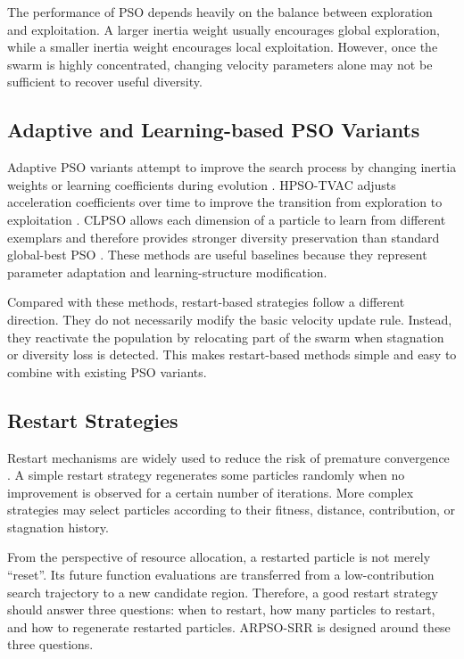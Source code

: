 \documentclass[conference]{IEEEtran}
\begin{document}
The performance of PSO depends heavily on the balance between exploration and exploitation. A larger inertia weight usually encourages global exploration, while a smaller inertia weight encourages local exploitation. However, once the swarm is highly concentrated, changing velocity parameters alone may not be sufficient to recover useful diversity.

\subsection{Adaptive and Learning-based PSO Variants}
Adaptive PSO variants attempt to improve the search process by changing inertia weights or learning coefficients during evolution \cite{b2,b12}. HPSO-TVAC adjusts acceleration coefficients over time to improve the transition from exploration to exploitation \cite{b11}. CLPSO allows each dimension of a particle to learn from different exemplars and therefore provides stronger diversity preservation than standard global-best PSO \cite{b4}. These methods are useful baselines because they represent parameter adaptation and learning-structure modification.

Compared with these methods, restart-based strategies follow a different direction. They do not necessarily modify the basic velocity update rule. Instead, they reactivate the population by relocating part of the swarm when stagnation or diversity loss is detected. This makes restart-based methods simple and easy to combine with existing PSO variants.

\subsection{Restart Strategies}
Restart mechanisms are widely used to reduce the risk of premature convergence \cite{b13,b14}. A simple restart strategy regenerates some particles randomly when no improvement is observed for a certain number of iterations. More complex strategies may select particles according to their fitness, distance, contribution, or stagnation history.

From the perspective of resource allocation, a restarted particle is not merely ``reset''. Its future function evaluations are transferred from a low-contribution search trajectory to a new candidate region. Therefore, a good restart strategy should answer three questions: when to restart, how many particles to restart, and how to regenerate restarted particles. ARPSO-SRR is designed around these three questions.
\end{document}
